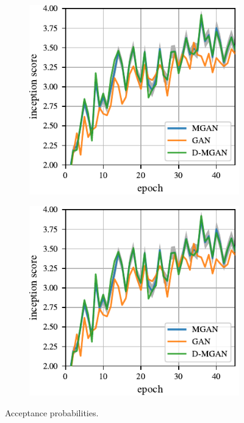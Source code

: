 \documentclass{article}
\begin{document}
\begin{figure}
    \centering
    \begin{subfigure}[b]{0.49\textwidth}
       \includegraphics[scale=1.0]{figures/base_iso.pdf}
    \end{subfigure}
    \begin{subfigure}[b]{0.49\textwidth}
       \includegraphics[scale=1.0]{figures/base_iso.pdf}
    \end{subfigure}
    \caption{{\small
    Acceptance probabilities.
    }}
    \label{fig:incep_by_epoch}
\end{figure}
\end{document}
